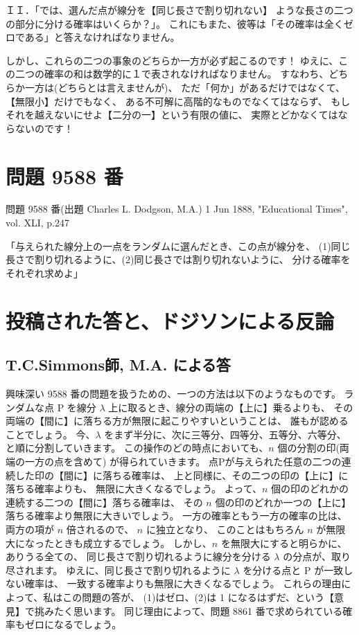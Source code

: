 \documentclass{article}
\begin{document}
ＩＩ．「では、選んだ点が線分を【同じ長さで割り切れない】
ような長さの二つの部分に分ける確率はいくらか？」。
これにもまた、彼等は「その確率は全くゼロである」と答えなければなりません。

 しかし、これらの二つの事象のどちらか一方が必ず起こるのです！
ゆえに、この二つの確率の和は数学的に１で表されなければなりません。
すなわち、どちらか一方は(どちらとは言えませんが)、
ただ「何か」があるだけではなくて、【無限小】だけでもなく、
ある不可解に高階的なものでなくてはならず、
もしそれを越えないにせよ【二分の一】という有限の値に、
実際とどかなくてはならないのです！

\section{問題 9588 番}

問題 9588 番(出題 Charles L. Dodgson, M.A.)
1 Jun 1888, "Educational Times", vol. XLI, p.247

「与えられた線分上の一点をランダムに選んだとき、この点が線分を、
(1)同じ長さで割り切れるように、(2)同じ長さでは割り切れないように、
分ける確率をそれぞれ求めよ」

\section{投稿された答と、ドジソンによる反論}

\subsection{T.C.Simmons師, M.A. による答}

 興味深い 9588 番の問題を扱うための、一つの方法は以下のようなものです。
ランダムな点 P を線分 $\lambda$ 上に取るとき、線分の両端の【上に】乗るよりも、
その両端の【間に】に落ちる方が無限に起こりやすいということは、
誰もが認めることでしょう。
今、$\lambda$ をまず半分に、次に三等分、四等分、五等分、六等分、と順に分割していきます。
この操作のどの時点においても、$n$ 個の分割の印(両端の一方の点を含めて)
が得られていきます。
点Pが与えられた任意の二つの連続した印の【間に】に落ちる確率は、
上と同様に、その二つの印の【上に】に落ちる確率よりも、
無限に大きくなるでしょう。
よって、$n$ 個の印のどれかの連続する二つの【間に】落ちる確率は、
その $n$ 個の印のどれか一つの【上に】落ちる確率より無限に大きいでしょう。
一方の確率ともう一方の確率の比は、両方の項が $n$ 倍されるので、
$n$ に独立となり、
このことはもちろん $n$ が無限大になったときも成立するでしょう。
しかし、$n$ を無限大にすると明らかに、ありうる全ての、
同じ長さで割り切れるように線分を分ける $\lambda$ の分点が、取り尽されます。
ゆえに、同じ長さで割り切れるように $\lambda$ を分ける点と P が一致しない確率は、
一致する確率よりも無限に大きくなるでしょう。
これらの理由によって、私はこの問題の答が、
(1)はゼロ、(2)は 1 になるはずだ、という【意見】で挑みたく思います。
  同じ理由によって、問題 8861 番で求められている確率もゼロになるでしょう。
\end{document}

